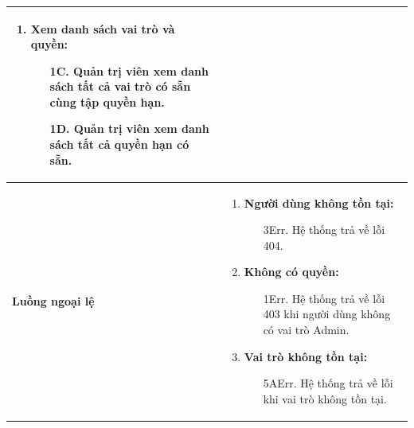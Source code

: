 {\begin{tabularx}{\textwidth}{|>{\raggedright\arraybackslash}p{3.5cm}|>{\raggedright\arraybackslash}X|}
\begin{enumerate}
\begin{enumerate}
    \end{enumerate}
    \item \textbf{Xem danh sách vai trò và quyền:}
    \begin{enumerate}
        \item[1C.] Quản trị viên xem danh sách tất cả vai trò có sẵn cùng tập quyền hạn.
        \item[1D.] Quản trị viên xem danh sách tất cả quyền hạn có sẵn.
    \end{enumerate}
\end{enumerate} \\
\hline
\textbf{Luồng ngoại lệ} &
\begin{enumerate}
    \item \textbf{Người dùng không tồn tại:}
    \begin{enumerate}
        \item[3Err.] Hệ thống trả về lỗi 404.
    \end{enumerate}
    \item \textbf{Không có quyền:}
    \begin{enumerate}
        \item[1Err.] Hệ thống trả về lỗi 403 khi người dùng không có vai trò Admin.
    \end{enumerate}
    \item \textbf{Vai trò không tồn tại:}
    \begin{enumerate}
        \item[5AErr.] Hệ thống trả về lỗi khi vai trò không tồn tại.
    \end{enumerate}
\end{enumerate} \\
\hline
\end{tabularx}
}
